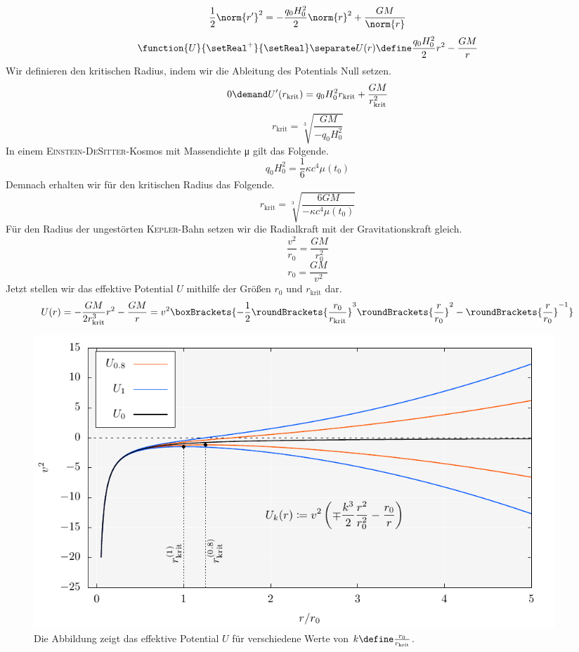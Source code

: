 \documentclass{atistandalonetask}
\begin{document}
\begin{atiSolution}
\begin{atiSubtaskSolutions}
{        \[
          \frac{1}{2}\norm{r'}^2 = -\frac{q_0H_0^2}{2}\norm{r}^2 + \frac{GM}{\norm{r}}
        \]
        \[
          \function{U}{\setReal^+}{\setReal}
          \separate
          U(r) \define \frac{q_0H_0^2}{2}r^2 - \frac{GM}{r}
        \]
        Wir definieren den kritischen Radius, indem wir die Ableitung des Potentials Null setzen.
        \[
          0 \demand U'(r_\mathrm{krit}) = q_0H_0^2r_\mathrm{krit} + \frac{GM}{r_\mathrm{krit}^2}
        \]
        \[
          r_\mathrm{krit} = \sqrt[3]{ \frac{GM}{-q_0H_0^2} }
        \]
        In einem \textsc{Einstein-DeSitter}-Kosmos mit Massendichte μ gilt das Folgende.
        \[
          q_0H_0^2 = \frac{1}{6}κc^4μ(t_0)
        \]
        Demnach erhalten wir für den kritischen Radius das Folgende.
        \[
          r_\mathrm{krit} = \sqrt[3]{ \frac{6GM}{-κc^4μ(t_0)} }
        \]
        Für den Radius der ungestörten \textsc{Kepler}-Bahn setzen wir die Radialkraft mit der Gravitationskraft gleich.
        \[
          \frac{v^2}{r_0} = \frac{GM}{r_0^2}
        \]
        \[
          r_0 = \frac{GM}{v^2}
        \]
        Jetzt stellen wir das effektive Potential $U$ mithilfe der Größen $r_0$ und $r_\mathrm{krit}$ dar.
        \[
          U(r)
          = -\frac{GM}{2r^3_\mathrm{krit}} r^2 - \frac{GM}{r}
          = v^2 \boxBrackets{ -\frac{1}{2} \roundBrackets{\frac{r_0}{r_\mathrm{krit}}}^3 \roundBrackets{\frac{r}{r_0}}^2 - \roundBrackets{\frac{r}{r_0}}^{-1} }
        \]
        \begin{figure}[H]
          \center
          \includegraphics[width=0.95\textwidth]{exercise_1-plot.pdf}
          \caption{Die Abbildung zeigt das effektive Potential $U$ für verschiedene Werte von $k\define \frac{r_0}{r_\mathrm{krit}}$.}
        \end{figure}
      }
    \end{atiSubtaskSolutions}
  \end{atiSolution}
\end{document}
